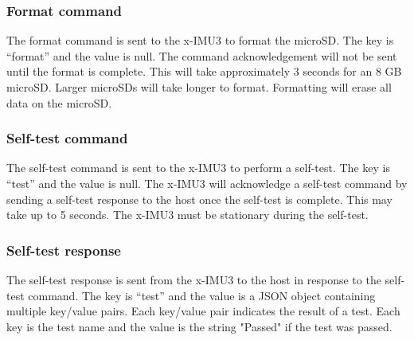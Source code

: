 
\subsubsection{Format command}

The format command is sent to the x-IMU3 to format the \ac{microSD}.  The key is \enquote{format} and the value is null.  The command acknowledgement will not be sent until the format is complete.  This will take approximately 3 seconds for an 8 GB \ac{microSD}.  Larger \acp{microSD} will take longer to format.  Formatting will erase all data on the \ac{microSD}.


\subsubsection{Self-test command}

The self-test command is sent to the x-IMU3 to perform a self-test.  The key is \enquote{test} and the value is null.  The x-IMU3 will acknowledge a self-test command by sending a self-test response to the host once the self-test is complete.  This may take up to 5 seconds.  The x-IMU3 must be stationary during the self-test.


\subsubsection{Self-test response}

The self-test response is sent from the x-IMU3 to the host in response to the self-test command.  The key is \enquote{test} and the value is a \ac{JSON} object containing multiple key/value pairs.  Each key/value pair indicates the result of a test.  Each key is the test name and the value is the string "Passed" if the test was passed.

